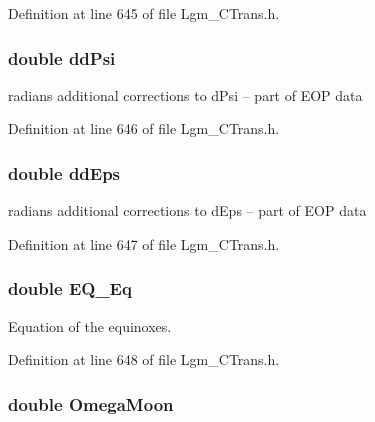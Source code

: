 Definition at line 645 of file Lgm\_\-CTrans.h.\hypertarget{struct_lgm___c_trans_437c2ba595193e711cf05a936202ff7c}{
\subsubsection[{ddPsi}]{\setlength{\rightskip}{0pt plus 5cm}double {\bf ddPsi}}}
\label{struct_lgm___c_trans_437c2ba595193e711cf05a936202ff7c}


radians additional corrections to dPsi -- part of EOP data 



Definition at line 646 of file Lgm\_\-CTrans.h.\hypertarget{struct_lgm___c_trans_b89becceff8337966d19fd8009f67e8a}{
\subsubsection[{ddEps}]{\setlength{\rightskip}{0pt plus 5cm}double {\bf ddEps}}}
\label{struct_lgm___c_trans_b89becceff8337966d19fd8009f67e8a}


radians additional corrections to dEps -- part of EOP data 



Definition at line 647 of file Lgm\_\-CTrans.h.\hypertarget{struct_lgm___c_trans_c6f3be420027cbc3b4eb413d913b98d1}{
\subsubsection[{EQ\_\-Eq}]{\setlength{\rightskip}{0pt plus 5cm}double {\bf EQ\_\-Eq}}}
\label{struct_lgm___c_trans_c6f3be420027cbc3b4eb413d913b98d1}


Equation of the equinoxes. 



Definition at line 648 of file Lgm\_\-CTrans.h.\hypertarget{struct_lgm___c_trans_7f6ddff92744a285390dfa690098f1a6}{
\subsubsection[{OmegaMoon}]{\setlength{\rightskip}{0pt plus 5cm}double {\bf OmegaMoon}}}
\label{struct_lgm___c_trans_7f6ddff92744a285390dfa690098f1a6}


